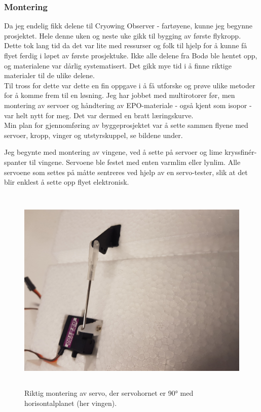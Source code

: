 \documentclass[12pt, a4paper]{article}
\begin{document}
\subsubsection{Montering}
Da jeg endelig fikk delene til Cryowing Observer - fartøyene, kunne jeg begynne prosjektet. Hele denne uken og neste uke gikk til bygging av første flykropp. Dette tok lang tid da det var lite med ressurser og folk til hjelp for å kunne få flyet ferdig i løpet av første prosjektuke. Ikke alle delene fra Bodø ble hentet opp, og materialene var dårlig systematisert. Det gikk mye tid i å finne riktige materialer til de ulike delene.\\
Til tross for dette var dette en fin oppgave i å få utforske og prøve ulike metoder for å komme frem til en løsning. Jeg har jobbet med multirotorer før, men montering av servoer og håndtering av EPO-materiale - også kjent som isopor - var helt nytt for meg. Det var dermed en bratt læringskurve. \\ Min plan for gjennomføring av byggeprosjektet var å sette sammen flyene med servoer, kropp, vinger og utstyrskuppel, se bildene under.

Jeg begynte med montering av vingene, ved å sette på servoer og lime kryssfinér-spanter til vingene. Servoene ble festet med enten varmlim eller lynlim. Alle servoene som settes på måtte sentreres ved hjelp av en servo-tester, slik at det blir enklest å sette opp flyet elektronisk. 

\begin{figure}[ht]
	\centering
	\includegraphics[height = 10cm, width = .6\textwidth]{bilder/servomontering.jpg}
	\caption[Servoorientering]{Riktig montering av servo, der servohornet er \ang{90} med horisontalplanet (her vingen).}
\end{figure}
\end{document}
